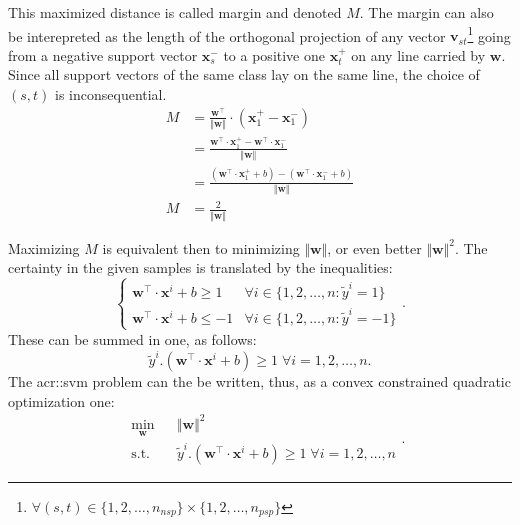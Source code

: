                 This maximized distance is called margin and denoted $M$.
                The margin can also be interepreted as the length of the orthogonal projection of any vector $\bm{v}_{st}$\footnote{$\forall (s, t) \in \{1,2,\dots,n_{nsp}\} \times \{1,2,\dots,n_{psp}\}$} going from a negative support vector $\bm{x}^-_s$ to a positive one $\bm{x}^+_t$ on any line carried by $\bm{w}$.
                Since all support vectors of the same class lay on the same line, the choice of $(s,t)$ is inconsequential.
                \begin{align}
                    M &= \frac{\bm{w}^\intercal}{\Vert\bm{w}\Vert} \cdot (\bm{x}^+_1 - \bm{x}^-_1) \nonumber \\
                    &= \frac{\bm{w}^\intercal\cdot\bm{x}^+_1 - \bm{w}^\intercal\cdot\bm{x}^-_1}{\Vert\bm{w}\Vert} \nonumber \\
                    &= \frac{(\bm{w}^\intercal\cdot\bm{x}^+_1 + b) - (\bm{w}^\intercal\cdot\bm{x}^-_1 + b)}{\Vert\bm{w}\Vert} \nonumber \\
                    M &= \frac{2}{\Vert\bm{w}\Vert}
                \end{align}

                Maximizing $M$ is equivalent then to minimizing $\Vert\bm{w}\Vert$, or even better $\Vert\bm{w}\Vert^2$.
                The certainty in the given samples is translated by the inequalities:
                \begin{equation*}
                    \begin{cases}
                        \bm{w}^\intercal\cdot\bm{x}^i + b \geq 1 & \forall i \in \{1, 2, \dots, n: \tilde{y}^i = 1\}\\
                        \bm{w}^\intercal\cdot\bm{x}^i + b \leq -1 & \forall i \in \{1, 2, \dots, n: \tilde{y}^i = -1\}
                    \end{cases}.
                \end{equation*}
                These can be summed in one, as follows:
                \begin{equation}
                    \label{eq::hard_margin}
                    \tilde{y}^i.(\bm{w}^\intercal\cdot\bm{x}^i + b) \geq 1 \; \forall i = 1, 2, \dots, n.
                \end{equation}
                The \gls{acr::svm} problem can the be written, thus, as a convex constrained quadratic optimization one:
                \begin{equation}
                    \label{eq::hard_svm_primal}
                    \begin{aligned}
                        & \min_{\bm{w}}
                        & & {\Vert \bm{w} \Vert}^2 \\
                        & \text{s.t.}
                        & & \tilde{y}^i.(\bm{w}^\intercal\cdot\bm{x}^i + b) \geq 1 \; \forall i = 1, 2, \dots, n
                    \end{aligned}.
                \end{equation}

